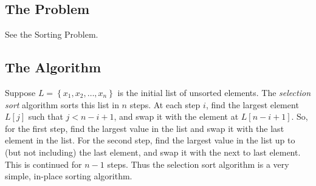 \documentclass[12pt]{article}
\begin{document}
\newcommand{\Lindent}{0.4in}
\newenvironment{Lalgorithm}[4]{
    \textbf{Algorithm} \textsc{#1}\texttt{(#2)}\newline
    \textit{Input}: #3\newline
    \textit{Output}: #4\newline

}{}
\newenvironment{Lfloatalgorithm}[6][h]{
    \begin{figure}[#1]
    \caption{#2}
    \begin{Lalgorithm}{#3}{#4}{#5}{#6}
}{
    \end{Lalgorithm}
    \end{figure}
}
\newcommand{\Lgets}{\ensuremath{\gets}}
\newcommand{\Lgroup}[1]{\textbf{begin}\\\hspace*{\Lindent}\parbox{\textwidth}{#1}\\\textbf{end}}
\newcommand{\Lif}[2]{\textbf{if} #1 \textbf{then}\\\hspace*{\Lindent}\parbox{\textwidth}{#2}} 
\newcommand{\Lelse}[1]{\textbf{else}\\\hspace*{\Lindent}\parbox{\textwidth}{#1}}
\newcommand{\Lelseif}[2]{\textbf{else if} #1 \textbf{then}\\\hspace*{\Lindent}\parbox{\textwidth}{#2}}
\newcommand{\Lfor}[2]{\textbf{for} #1 \textbf{do}\\\hspace*{\Lindent}\parbox{\textwidth}{#2}}


\subsection*{The Problem}

See the Sorting Problem.
    
\subsection*{The Algorithm}

Suppose $L = \left\{ x_1, x_2, \dots, x_n\right\}$ is the initial list of unsorted elements.
The \emph{selection sort} algorithm sorts this list in $n$ steps.  At each step $i$, find the largest
element $L[j]$ such that $j < n - i + 1$, and swap it with the element at $L[n - i + 1]$.
So, for the first step, find the largest value in the list and swap it with the last element in the list.
For the second step, find the largest value in the list up to (but not including) the last element, and swap it
with the next to last element.  This is continued for $n - 1$ steps.  Thus the selection sort algorithm is a
very simple, in-place sorting algorithm.
\end{document}
